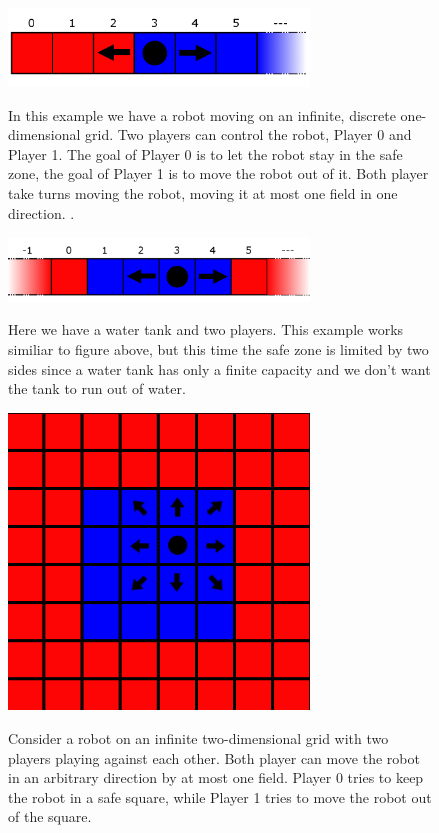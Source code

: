 \documentclass[10pt,a4paper]{article}
\author{Examples}
\theoremstyle{plain}
\theoremstyle{definition}
\begin{document}
\begin{figure}[h] \label{Laufband}
  \caption{In this example we have a robot moving on an infinite, discrete one-dimensional grid. Two players can control the robot, Player 0 and Player 1. The goal of Player 0 is to let the robot stay in the safe zone, the goal of Player 1 is to move the robot out of it. Both player take turns moving the robot, moving it at most one field in one direction.
.}
  \centering
    {\includegraphics[width=8.0cm]{laufband.png}} 

\end{figure}


\begin{figure}[h]\label{Wassertank}
  \caption{Here we have a water tank and two players. This example works similiar to figure above, but this time the safe zone is limited by two sides since a water tank has only a finite capacity and we don't want the tank to run out of water.
}
  \centering
    {\includegraphics[width=8.0cm]{wasser_tank.png}} 
\end{figure}

\begin{figure}
  \caption{Consider a robot on an infinite two-dimensional grid with two players playing against each other. Both player can move the robot in an arbitrary direction by at most one field. Player 0 tries to keep the robot in a safe square, while Player 1 tries to move the robot out of the square.
}
  \centering
    {\includegraphics[width=8.0cm]{quadrat.png}} 
\end{figure}
\end{document}
